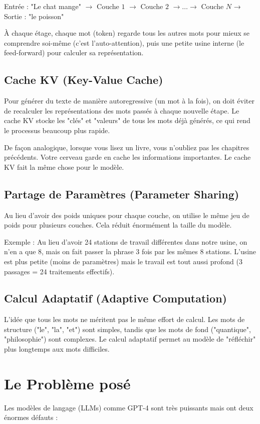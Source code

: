 \documentclass{article}
\begin{document}
Entrée : "Le chat mange" $\rightarrow$ Couche $1$ $\rightarrow$ Couche $2$
$\rightarrow \ldots \rightarrow $  Couche $N$ → Sortie : "le poisson"

À chaque étage, chaque mot (token) regarde tous les autres mots pour mieux
se comprendre soi-même (c'est l'auto-attention), puis une petite usine interne
(le feed-forward) pour calculer sa représentation.

\subsection{Cache KV (Key-Value Cache)}
Pour générer du texte de manière autoregressive (un mot à la fois),
on doit éviter de recalculer les représentations des mots passés
à chaque nouvelle étape. Le cache KV stocke les "clés" et "valeurs" de tous
les mots déjà générés, ce qui rend le processus beaucoup plus rapide.

De façon analogique, lorsque vous lisez un livre, vous n'oubliez
pas les chapitres précédents. Votre cerveau garde en cache les informations
importantes. Le cache KV fait la même chose pour le modèle.

\subsection{Partage de Paramètres (Parameter Sharing)}
Au lieu d'avoir des poids uniques pour chaque couche, on utilise le même jeu
de poids pour plusieurs couches. Cela réduit énormément la taille du modèle.

Exemple : Au lieu d'avoir 24 stations de travail différentes dans notre usine,
on n'en a que 8, mais on fait passer la phrase 3 fois par les mêmes 8 stations.
L'usine est plus petite (moins de paramètres) mais le travail est tout aussi
profond (3 passages = 24 traitements effectifs).

\subsection{Calcul Adaptatif (Adaptive Computation)}
L'idée que tous les mots ne méritent pas le même effort de calcul.
Les mots de structure ("le", "la", "et") sont simples, tandis que les mots
de fond ("quantique", "philosophie") sont complexes. Le calcul adaptatif
permet au modèle de "réfléchir" plus longtemps aux mots difficiles.

\section{Le Problème posé}
Les modèles de langage (LLMs) comme GPT-4 sont très puissants
mais ont deux énormes défauts :
\end{document}
